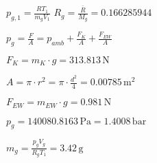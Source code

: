 \( p_{g,1} = \frac{R T_1}{m_g V_1} \)  
\( R_g = \frac{\bar{R}}{M_g} = 0.166285944 \)  

\( p_{g} = \frac{F}{A} = p_{amb} + \frac{F_K}{A} + \frac{F_{EW}}{A} \)  

\( F_K = m_K \cdot g = 313.813 \, \text{N} \)  

\( A = \pi \cdot r^2 = \pi \cdot \frac{d^2}{4} = 0.00785 \, \text{m}^2 \)  

\( F_{EW} = m_{EW} \cdot g = 0.981 \, \text{N} \)  

\( p_{g} = 140080.8163 \, \text{Pa} = 1.4008 \, \text{bar} \)  

\( m_g = \frac{p_{g} V_g}{R_g T_1} = 3.42 \, \text{g} \)